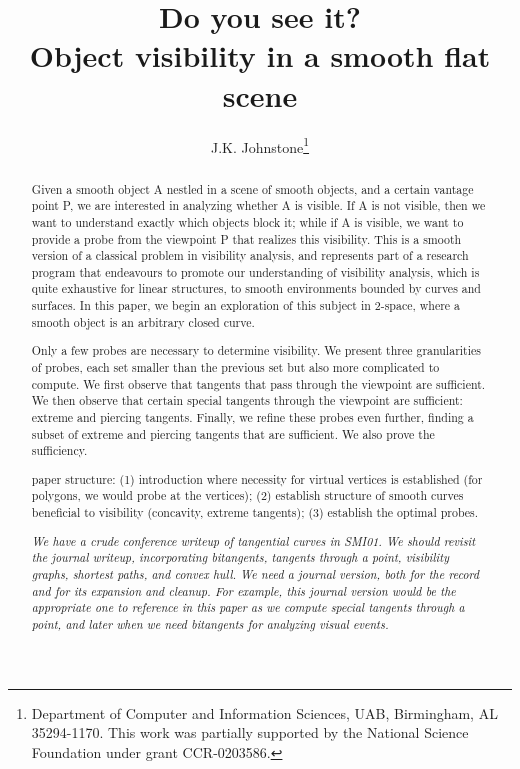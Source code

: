 \documentclass[12pt]{article}
\title{Do you see it?\\Object visibility in a smooth flat scene}
\author{J.K. Johnstone\thanks{Department of Computer and 
    Information Sciences, UAB, Birmingham, AL 35294-1170.  This work
    was partially supported by the National Science Foundation under grant CCR-0203586.}}
\begin{document}
\maketitle

\begin{abstract}
Given a smooth object A nestled in a scene of smooth objects, and
a certain vantage point P, we are interested in analyzing whether A is visible.
If A is not visible, then we want to understand exactly which objects block it;
while if A is visible, we want to provide a probe from the viewpoint P that realizes
this visibility.
This is a smooth version of a classical problem in visibility analysis,
and represents part of a research program that endeavours to promote
our understanding of visibility analysis, which is quite exhaustive for linear structures,
to smooth environments bounded by curves and surfaces.
In this paper, we begin an exploration of this subject 
in 2-space, where a smooth object is an arbitrary closed curve.

Only a few probes are necessary to determine visibility.
We present three granularities of probes, each set smaller than the previous set but
also more complicated to compute.
We first observe that tangents that pass through the viewpoint are sufficient.
We then observe that certain special tangents through the viewpoint are sufficient:
extreme and piercing tangents.
Finally, we refine these probes even further, finding a subset of extreme
and piercing tangents that are sufficient.
We also prove the sufficiency.

paper structure: (1) introduction where necessity for virtual vertices is established
(for polygons, we would probe at the vertices);
(2) establish structure of smooth curves beneficial to visibility (concavity, 
extreme tangents); (3) establish the optimal probes.

{\em We have a crude conference writeup of tangential curves in SMI01.
We should revisit the journal writeup, incorporating bitangents, tangents through a 
point, visibility graphs, shortest paths, and convex hull.
We need a journal version, both for the record and for its expansion and cleanup.
For example, this journal version would be the appropriate one to reference
in this paper as we compute special tangents through a point, and later when
we need bitangents for analyzing visual events.}
\end{abstract}

\end{document}
